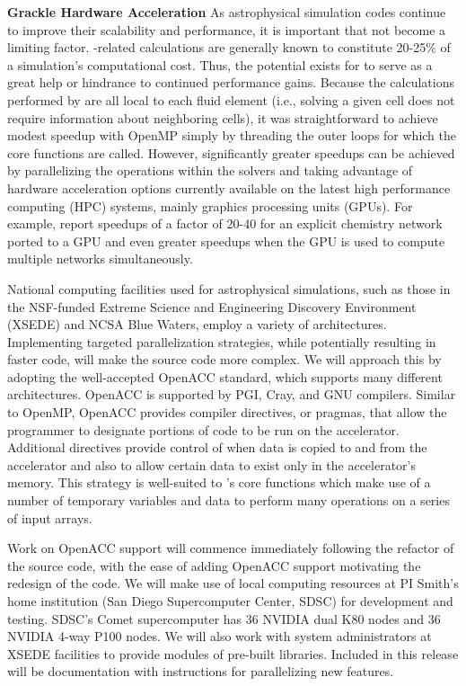 \noindent \textbf{Grackle Hardware Acceleration}
As astrophysical simulation codes continue to improve their
scalability and performance, it is important that \grackle{} not
become a limiting factor.  \grackle{}-related calculations are
generally known to constitute 20-25\% of a simulation's computational
cost.  Thus, the potential exists for \grackle{} to serve as a great
help or hindrance to continued performance gains.  Because the
calculations performed by \grackle{} are all local to each fluid
element (i.e., solving a given cell does not require information about
neighboring cells), it was straightforward to achieve modest speedup
with OpenMP simply by threading the outer loops for which the core
functions are called.  However, significantly greater speedups can be
achieved by parallelizing the operations within the solvers and taking
advantage of hardware acceleration options currently available on the
latest high performance computing (HPC) systems, mainly graphics
processing units (GPUs). For example, \citet{Haidar2016PerformanceAA}
report speedups of a factor of 20-40 for an explicit chemistry network
ported to a GPU and even greater speedups when the GPU is used to
compute multiple networks simultaneously.

National computing facilities used for astrophysical simulations, such
as those in the NSF-funded Extreme Science and Engineering Discovery
Environment (XSEDE) and NCSA Blue Waters, employ a variety of
architectures.  Implementing targeted parallelization strategies,
while potentially resulting in faster code, will make the source code
more complex. We will approach this by adopting the well-accepted
OpenACC standard, which supports many different architectures.
OpenACC is supported 
by PGI, Cray, and GNU compilers.  Similar to OpenMP, OpenACC provides
compiler directives, or pragmas, that allow the programmer to
designate portions of code to be run on the
accelerator.  Additional directives provide control of when data is
copied to and from the accelerator and also to allow certain data to
exist only in the accelerator's memory.  This strategy is well-suited
to \grackle{}'s core functions which make use of a number of temporary
variables and data to perform many operations on a series of input
arrays.

Work on OpenACC support will commence immediately following the
refactor of the \grackle{} source code, with the ease of adding
OpenACC support motivating the redesign of the code.  We will
make use of local computing resources at PI Smith's home institution
(San Diego Supercomputer Center, SDSC) for development and testing.
SDSC's Comet supercomputer has 36 NVIDIA dual K80 nodes and 36 NVIDIA
4-way P100 nodes. We will also work with system administrators at
XSEDE facilities to provide modules of pre-built \grackle{}
libraries.
Included in this release will be documentation with instructions for
parallelizing new features.

